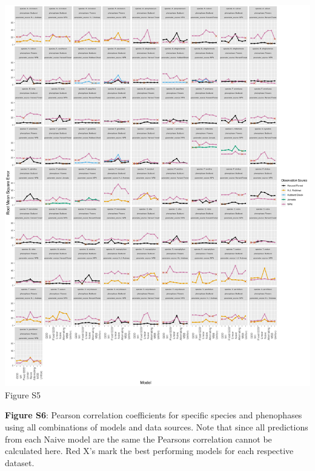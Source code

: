 \documentclass[a4paper,12pt]{article}
\begin{document}
\begin{center}
	\centering
		\includegraphics[width=1\textwidth]{supplement_all_model_rmse.png}
	Figure S5
\end{center}

\newpage
\textbf{Figure S6}: Pearson correlation coefficients for specific species and phenophases using all combinations of models and data sources. Note that since all predictions from each Naive model are the same the Pearsons correlation cannot be calculated here. Red X's mark the best performing models for each respective dataset.

\newpage
\end{document}
